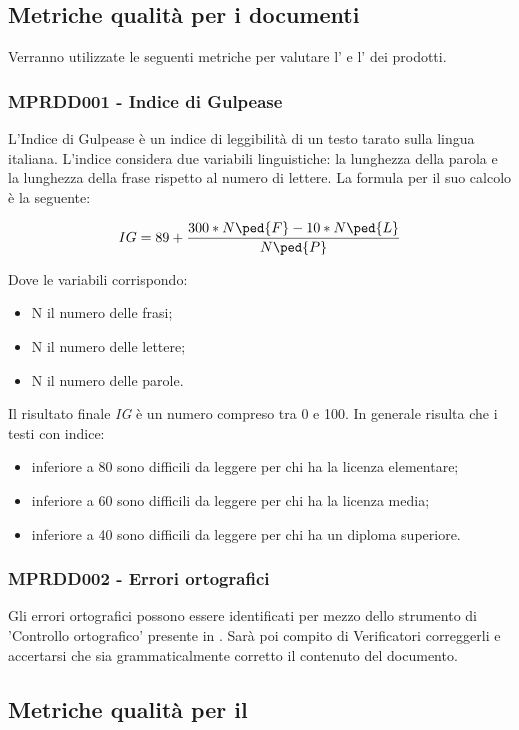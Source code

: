 {\subsection{Metriche qualità per i documenti}
\label{sec:qualita_prodotto}
Verranno utilizzate le seguenti metriche per valutare l’ e l’ dei prodotti.
\subsubsection{MPRDD001 - Indice di Gulpease}
L'Indice di Gulpease è un indice di leggibilità di un testo tarato sulla lingua italiana.
L'indice considera due variabili linguistiche: la lunghezza della parola e la lunghezza della frase rispetto al numero di lettere. La formula per il suo calcolo è la seguente:
\begin{center}
    \begin{displaymath}
        IG = 89 + {300 * N\ped{F} - 10 * N\ped{L} \over N\ped{P}}
    \end{displaymath}
\end{center}
Dove le variabili corrispondo:
\begin{itemize}
    \item N il numero delle frasi;
    \item N il numero delle lettere; 
    \item N il numero delle parole.
\end{itemize}
Il risultato finale  \emph{IG} è un numero compreso tra 0 e 100. In generale risulta che i testi con indice:
\begin{itemize}
    \item inferiore a 80 sono difficili da leggere per chi ha la licenza elementare;
    \item inferiore a 60 sono difficili da leggere per chi ha la licenza media;
    \item inferiore a 40 sono difficili da leggere per chi ha un diploma superiore.
\end{itemize}
\subsubsection{MPRDD002 - Errori ortografici}
Gli errori ortografici possono essere identificati per mezzo dello strumento di 'Controllo ortografico' presente in . Sarà poi compito di Verificatori correggerli e accertarsi che sia grammaticalmente corretto il contenuto del documento.

\subsection{Metriche qualità per il }
\label{sec:metriche_software}
}
